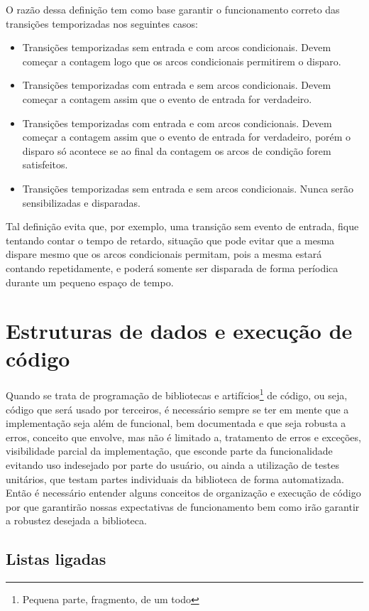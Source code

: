 O razão dessa definição tem como base garantir o funcionamento correto das transições temporizadas nos seguintes casos:

\begin{itemize}
	\item Transições temporizadas sem entrada e com arcos condicionais. Devem começar a contagem logo que os arcos condicionais permitirem o disparo. 
	\item Transições temporizadas com entrada e sem arcos condicionais. Devem começar a contagem assim que o evento de entrada for verdadeiro. 
	\item Transições temporizadas com entrada e com arcos condicionais. Devem começar a contagem assim que o evento de entrada for verdadeiro, porém o disparo só acontece se ao final da contagem os arcos de condição forem satisfeitos. 
	\item Transições temporizadas sem entrada e sem arcos condicionais. Nunca serão sensibilizadas e disparadas. 
\end{itemize}

Tal definição evita que, por exemplo, uma transição sem evento de entrada, fique tentando contar o tempo de retardo, situação que pode evitar que a mesma dispare mesmo que os arcos condicionais permitam, pois a mesma estará contando repetidamente, e poderá somente ser disparada de forma períodica durante um pequeno espaço de tempo.

\section{Estruturas de dados e execução de código}

Quando se trata de programação de bibliotecas e artifícios\footnote{Pequena parte, fragmento, de um todo} de código, ou seja, código que será usado por terceiros, é necessário sempre se ter em mente que a implementação seja além de funcional, bem documentada e que seja robusta a erros, conceito que envolve, mas não é limitado a, tratamento de erros e exceções, visibilidade parcial da implementação, que esconde parte da funcionalidade evitando uso indesejado por parte do usuário, ou ainda a utilização de testes unitários, que testam partes individuais da biblioteca de forma automatizada. Então é necessário entender alguns conceitos de organização e execução de código por que garantirão nossas expectativas de funcionamento bem como irão garantir a robustez desejada a biblioteca. 

\subsection{Listas ligadas}

